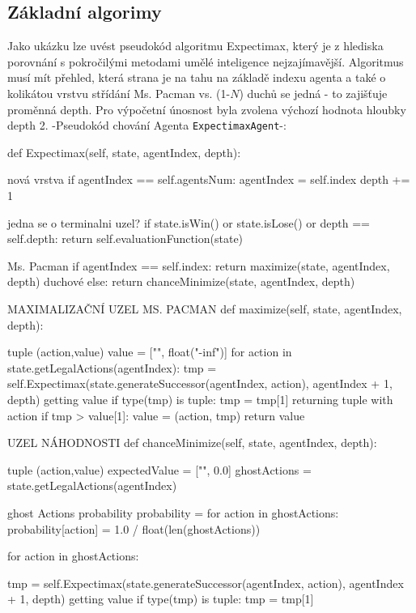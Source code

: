 \begin{enumerate}
\section{Základní algorimy}
Jako ukázku lze uvést pseudokód algoritmu Expectimax, který je z hlediska porovnání s pokročilými metodami umělé inteligence nejzajímavější. Algoritmus musí mít přehled, která strana je na tahu na základě indexu agenta a také o kolikátou vrstvu střídání Ms. Pacman vs. (1-$N$) duchů se jedná - to zajišťuje proměnná depth. Pro výpočetní únosnost byla zvolena výchozí hodnota hloubky depth 2.
\newline
-Pseudokód chování Agenta \texttt{ExpectimaxAgent}-:

def Expectimax(self, state, agentIndex, depth):

    nová vrstva
    if agentIndex == self.agentsNum:
        agentIndex = self.index
        depth += 1

    jedna se o terminalni uzel?
    if state.isWin() or state.isLose() or depth == self.depth:
        return self.evaluationFunction(state)

    Ms. Pacman
    if agentIndex == self.index:
        return maximize(state, agentIndex, depth)
    duchové
    else:
        return chanceMinimize(state, agentIndex, depth)

MAXIMALIZAČNÍ UZEL MS. PACMAN
def maximize(self, state, agentIndex, depth):

     tuple (action,value)
    value = ["", float("-inf")]
    for action in state.getLegalActions(agentIndex):
        tmp = self.Expectimax(state.generateSuccessor(agentIndex, action), agentIndex + 1, depth)
         getting value
        if type(tmp) is tuple:
            tmp = tmp[1]
        returning tuple with action
        if tmp > value[1]:
            value = (action, tmp)
    return value

UZEL NÁHODNOSTI
def chanceMinimize(self, state, agentIndex, depth):

     tuple (action,value)
    expectedValue = ["", 0.0]
    ghostActions = state.getLegalActions(agentIndex)

     ghost Actions probability
    probability = {}
    for action in ghostActions:
        probability[action] = 1.0 / float(len(ghostActions))

    for action in ghostActions:

        tmp = self.Expectimax(state.generateSuccessor(agentIndex, action), agentIndex + 1, depth)
         getting value
        if type(tmp) is tuple:
            tmp = tmp[1]


\end{enumerate}
